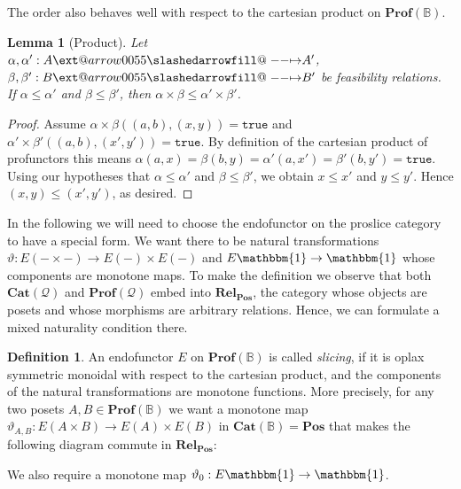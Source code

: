 \documentclass[12pt]{article}
\makeatletter
\theoremstyle{definition}
\newtheorem{definition}{Definition}[section]
\theoremstyle{plain}
\newtheorem{lemma}{Lemma}[section]
\theoremstyle{plain}
\theoremstyle{plain}
\theoremstyle{plain}
\theoremstyle{remark}
\theoremstyle{remark}
\newcommand{\mc}[1]{\mathcal{#1}}
\def\slashedarrowfill@#1#2#3#4#5{%
	$\m@th\thickmuskip0mu\medmuskip\thickmuskip\thinmuskip\thickmuskip
	\relax#5#1\mkern-7mu%
	\cleaders\hbox{$#5\mkern-2mu#2\mkern-2mu$}\hfill
	\mathclap{#3}\mathclap{#2}%
	\cleaders\hbox{$#5\mkern-2mu#2\mkern-2mu$}\hfill
	\mkern-7mu#4$%
}
\def\rightslashedarrowfill@{%
	\slashedarrowfill@\relbar\relbar\mapstochar\rightarrow}
\newcommand\xslashedrightarrow[2][]{%
	\ext@arrow 0055{\rightslashedarrowfill@}{#1}{#2}}
\makeatother
\begin{document}
The order also behaves well with respect to the cartesian product on $\mathbf{Prof}(\mathbb{B})$.

\begin{lemma}[Product] \label{product lemma}
	Let $\alpha, \alpha': A \xslashedrightarrow{} A'$, $\beta, \beta': B \xslashedrightarrow{} B'$ be feasibility relations. If $\alpha \leq \alpha'$ and $\beta \leq \beta'$, then $\alpha \times \beta \leq \alpha' \times \beta'$.
\end{lemma}
\begin{proof}
	Assume $\alpha \times \beta((a,b),(x,y)) = \mathtt{true}$ and $\alpha' \times \beta'((a,b),(x',y')) = \mathtt{true}$. By definition of the cartesian product of profunctors this means $\alpha(a,x) = \beta(b,y) = \alpha'(a,x') = \beta'(b,y') = \mathtt{true}$. Using our hypotheses that  $\alpha \leq \alpha'$ and $\beta \leq \beta'$, we obtain $x \leq x'$ and $y \leq y'$. Hence $(x,y) \leq (x',y')$, as desired.
\end{proof}

In the following we will need to choose the endofunctor on the proslice category to have a special form. We want there to be natural transformations  $\vartheta: E(- \times -) \rightarrow E(-) \times E(-)$ and $E\mathbbm{1} \rightarrow \mathbbm{1}$ whose components are monotone maps. To make the definition we observe that both $\mathbf{Cat}(\mc{Q})$ and $\mathbf{Prof}(\mc{Q})$ embed into $\mathbf{Rel_{Pos}}$, the category whose objects are posets and whose morphisms are arbitrary relations. Hence, we can formulate a mixed naturality condition there.

\begin{definition}
	An endofunctor $E$ on $\mathbf{Prof}(\mathbb{B})$ is called \emph{slicing}, if it is oplax symmetric monoidal with respect to the cartesian product, and the components of the natural transformations are monotone functions. More precisely, for any two posets $A,B \in \mathbf{Prof}(\mathbb{B})$ we want a monotone map $\vartheta_{A,B}: E(A \times B) \rightarrow E(A) \times E(B)$ in $\mathbf{Cat}(\mathbb{B}) = \mathbf{Pos}$ that makes the following diagram commute in $\mathbf{Rel_{Pos}}$:
	\begin{center}
	\end{center}
	We also require a monotone map $\vartheta_0 :E\mathbbm{1} \rightarrow \mathbbm{1}$.
	
	
	
\end{definition}  
\end{document}
